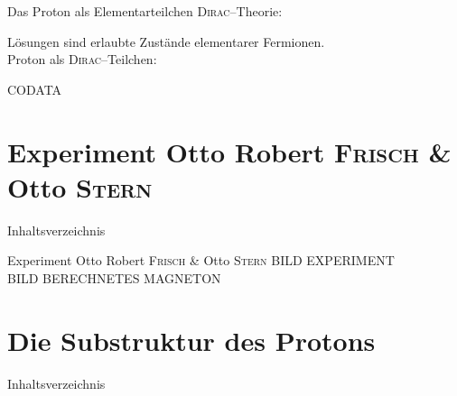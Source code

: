 \documentclass[t,9pt]{beamer}
\begin{document}
        \begin{frame}{Das Proton als Elementarteilchen}
                \textsc{Dirac}--Theorie: 
                \begin{center}
                \end{center}
                Lösungen sind erlaubte Zustände elementarer Fermionen.
                \pause %
                \\\vspace{.5cm} Proton als \textsc{Dirac}--Teilchen:
                \begin{center}
                \end{center}
                \tiny\vspace{-.2cm}\hspace{8.1cm}CODATA\cite{CODATA_nuclear_magneton}\normalsize
        \end{frame}

        \section{Experiment Otto Robert \textsc{Frisch} \& Otto \textsc{Stern}} 

        \begin{frame}{Inhaltsverzeichnis}
                \tableofcontents[currentsection]
        \end{frame}

        \begin{frame}{Experiment Otto Robert \textsc{Frisch} \& Otto \textsc{Stern}} 
                BILD EXPERIMENT\\BILD BERECHNETES MAGNETON
        \end{frame}

        \section{Die Substruktur des Protons}

        \begin{frame}{Inhaltsverzeichnis}
                \tableofcontents[currentsection]
        \end{frame}
\end{document}
